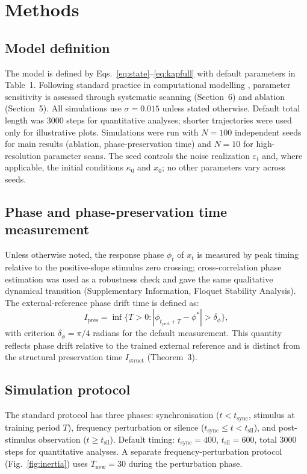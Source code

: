 \section{Methods}

\subsection{Model definition}
The model is defined by Eqs.~\eqref{eq:state}--\eqref{eq:kapfull} with default parameters in Table~1. Following standard practice in computational modelling \cite{burnham2002model}, parameter sensitivity is assessed through systematic scanning (Section~6) and ablation (Section~5). All simulations use $\sigma = 0.015$ unless stated otherwise. Default total length was 3000 steps for quantitative analyses; shorter trajectories were used only for illustrative plots. Simulations were run with $N=100$ independent seeds for main results (ablation, phase-preservation time) and $N=10$ for high-resolution parameter scans. The seed controls the noise realization $\varepsilon_t$ and, where applicable, the initial conditions $\kappa_0$ and $x_0$; no other parameters vary across seeds.

\subsection{Phase and phase-preservation time measurement}
Unless otherwise noted, the response phase $\phi_t$ of $x_t$ is measured by peak timing relative to the positive-slope stimulus zero crossing; cross-correlation phase estimation was used as a robustness check and gave the same qualitative dynamical transition (Supplementary Information, Floquet Stability Analysis). The external-reference phase drift time is defined as:
\begin{equation}\label{eq:ciindex}
I_{\mathrm{pres}} = \inf\big\{T > 0 : |\phi_{t_{\mathrm{pert}}+T} - \phi^*| > \delta_\phi\big\},
\end{equation}
with criterion $\delta_\phi = \pi/4$ radians for the default measurement. This quantity reflects phase drift relative to the trained external reference and is distinct from the structural preservation time $I_{\mathrm{struct}}$ (Theorem~3).

\subsection{Simulation protocol}
The standard protocol has three phases: synchronisation ($t < t_{\mathrm{sync}}$, stimulus at training period $T$), frequency perturbation or silence ($t_{\mathrm{sync}} \leq t < t_{\mathrm{sil}}$), and post-stimulus observation ($t \geq t_{\mathrm{sil}}$). Default timing: $t_{\mathrm{sync}} = 400$, $t_{\mathrm{sil}} = 600$, total $3000$ steps for quantitative analyses. A separate frequency-perturbation protocol (Fig.~\ref{fig:inertia}) uses $T_{\mathrm{new}} = 30$ during the perturbation phase.

